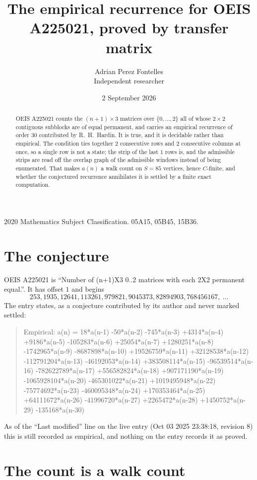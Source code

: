\documentclass[11pt,a4paper]{article}
\title{The empirical recurrence for OEIS A225021, proved by transfer matrix}
\author{Adrian Perez Fontelles\\ \small Independent researcher}
\date{2 September 2026}
\theoremstyle{plain}
\theoremstyle{definition}
\begin{document}
\maketitle

\begin{abstract}
OEIS A225021 counts the $(n+1)\times3$ matrices over $\{0,\dots,2\}$ all of whose
$2\times2$ contiguous subblocks are of equal permanent, and carries an empirical recurrence of order
$30$ contributed by R.~H.~Hardin. It is true, and it is decidable rather than empirical.
The condition ties together $2$ consecutive rows and $2$ consecutive columns at once, so a
single row is not a state; the strip of the last $1$ rows is, and the admissible strips
are read off the overlap graph of the admissible windows instead of being enumerated. That
makes $a(n)$ a walk count on $S=85$ vertices, hence $C$-finite, and whether the conjectured
recurrence annihilates it is settled by a finite exact computation.
\end{abstract}

\noindent\small 2020 Mathematics Subject Classification. 05A15, 05B45, 15B36.\normalsize

\section{The conjecture}

OEIS A225021 is ``Number of (n+1)X3 0..2 matrices with each 2X2 permanent equal.''. It has offset $1$ and begins
\[
253, 1935, 12641, 113261, 979821, 9045373, 82894903, 768456167,\ \dots
\]
The entry states, as a conjecture contributed by its author and never marked settled:
\begin{quote}
Empirical: a(n) = 18*a(n-1) -50*a(n-2) -745*a(n-3) +4314*a(n-4) +9186*a(n-5) -105283*a(n-6) +25054*a(n-7) +1280251*a(n-8) -1742965*a(n-9) -8687898*a(n-10) +19526759*a(n-11) +32128538*a(n-12) -112791204*a(n-13) -46192053*a(n-14) +383508114*a(n-15) -96539514*a(n-16) -782622789*a(n-17) +556582824*a(n-18) +907171190*a(n-19) -1065928104*a(n-20) -465301022*a(n-21) +1019495948*a(n-22) -75774692*a(n-23) -460095348*a(n-24) +170353464*a(n-25) +64111672*a(n-26) -41996720*a(n-27) +2265472*a(n-28) +1450752*a(n-29) -135168*a(n-30)
\end{quote}
As of the ``Last modified'' line on the live entry (Oct 03 2025 23:38:18, revision 8) this is still
recorded as empirical, and nothing on the entry records it as proved.

\section{The count is a walk count}
\end{document}
